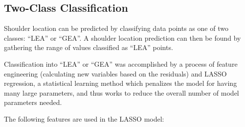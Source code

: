 \documentclass[12pt]{article}
\begin{document}
\subsection{Two-Class Classification}

Shoulder location can be predicted by classifying data points as one of
two classes: ``LEA'' or ``GEA''. A shoulder location prediction can then
be found by gathering the range of values classified as ``LEA'' points.

Classification into ``LEA'' or ``GEA'' was accomplished by a process of
feature engineering (calculating new variables based on the residuals)
and LASSO regression, a statistical learning method which penalizes the
model for having many large parameters, and thus works to reduce the
overall number of model parameters needed.

The following features are used in the LASSO model:
\end{document}
